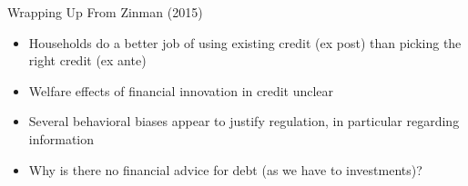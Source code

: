 \documentclass[theme=default]{beamer}
\begin{document}
\begin{frame}{Wrapping Up}
From Zinman (2015)
\begin{itemize}
	\item Households do a better job of using existing credit (ex post) than picking the right credit (ex ante)
	\item Welfare effects of financial innovation in credit unclear
	\item Several behavioral biases appear to justify regulation, in particular regarding information
	\item Why is there no financial advice for debt (as we have to investments)?
\end{itemize}
\end{frame}
\end{document}
